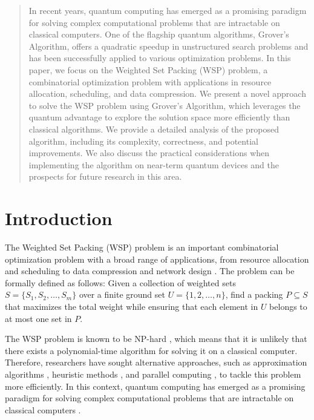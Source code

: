 \begin{abstract}
In recent years, quantum computing has emerged as a promising paradigm for solving complex computational problems that are intractable on classical computers. One of the flagship quantum algorithms, Grover's Algorithm, offers a quadratic speedup in unstructured search problems and has been successfully applied to various optimization problems. In this paper, we focus on the Weighted Set Packing (WSP) problem, a combinatorial optimization problem with applications in resource allocation, scheduling, and data compression. We present a novel approach to solve the WSP problem using Grover's Algorithm, which leverages the quantum advantage to explore the solution space more efficiently than classical algorithms. We provide a detailed analysis of the proposed algorithm, including its complexity, correctness, and potential improvements. We also discuss the practical considerations when implementing the algorithm on near-term quantum devices and the prospects for future research in this area.

\end{abstract}

\section{Introduction}
\label{sec:introduction}

The Weighted Set Packing (WSP) problem is an important combinatorial optimization problem with a broad range of applications, from resource allocation and scheduling to data compression and network design \cite{Karp1972,Hochbaum1997}. The problem can be formally defined as follows: Given a collection of weighted sets $S = \{S_1, S_2, \ldots, S_m\}$ over a finite ground set $U = \{1, 2, \ldots, n\}$, find a packing $P \subseteq S$ that maximizes the total weight while ensuring that each element in $U$ belongs to at most one set in $P$.

The WSP problem is known to be NP-hard \cite{Karp1972}, which means that it is unlikely that there exists a polynomial-time algorithm for solving it on a classical computer. Therefore, researchers have sought alternative approaches, such as approximation algorithms \cite{Hochbaum1997}, heuristic methods \cite{Garey1979}, and parallel computing \cite{Kumar1994}, to tackle this problem more efficiently. In this context, quantum computing has emerged as a promising paradigm for solving complex computational problems that are intractable on classical computers \cite{Shor1994,Grover1996}.

